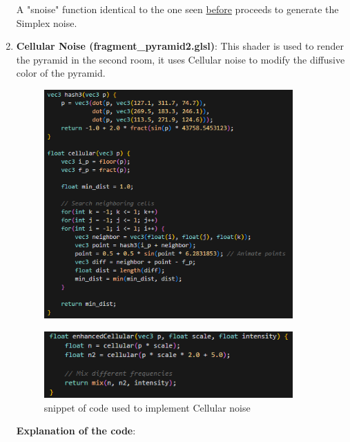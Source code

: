 \documentclass[12pt]{article}
\begin{document}
\begin{enumerate}
    A "snoise" function identical to the one seen \hyperref[img:snoiseFunction]{before} proceeds to generate the Simplex noise.

    \newpage

    \item \textbf{Cellular Noise (fragment\_pyramid2.glsl)}:
    \newline
    This shader is used to render the pyramid in the second room, it uses Cellular noise to modify the diffusive color of the pyramid.      
    
    \begin{figure}[H]
        \centering
        \includegraphics[width=0.9\textwidth]{Images/pyramid2code.png}
    \end{figure}

    \begin{figure}[H]
        \centering
        \includegraphics[width=0.9\textwidth]{Images/pyramid2code2.png}
        \caption{snippet of code used to implement Cellular noise}
    \end{figure}
    
\newpage

    \textbf{Explanation of the code}:
    \begin {itemize}


\end{itemize}
\end{enumerate}
\end{document}
